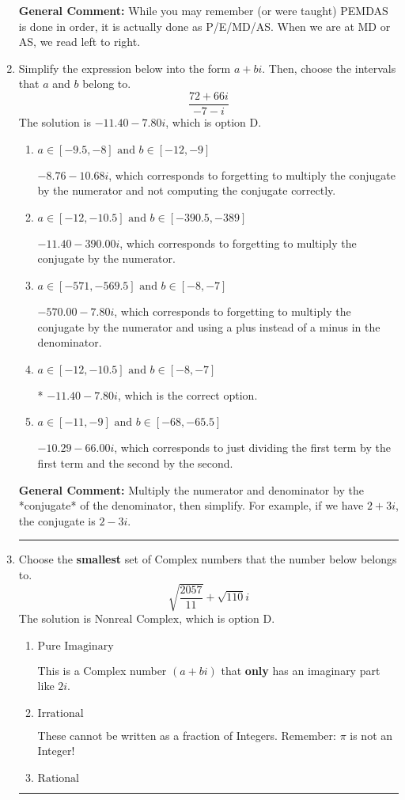 \documentclass{extbook}[14pt]
\newcommand{\litem}[1]{\item #1

\rule{\textwidth}{0.4pt}}
\begin{document}
\begin{enumerate}
{\textbf{General Comment:} While you may remember (or were taught) PEMDAS is done in order, it is actually done as P/E/MD/AS. When we are at MD or AS, we read left to right.
}
\litem{
Simplify the expression below into the form $a+bi$. Then, choose the intervals that $a$ and $b$ belong to.
\[ \frac{72 + 66 i}{-7 - i} \]The solution is \( -11.40  - 7.80 i \), which is option D.\begin{enumerate}[label=\Alph*.]
\item \( a \in [-9.5, -8] \text{ and } b \in [-12, -9] \)

 $-8.76  - 10.68 i$, which corresponds to forgetting to multiply the conjugate by the numerator and not computing the conjugate correctly.
\item \( a \in [-12, -10.5] \text{ and } b \in [-390.5, -389] \)

 $-11.40  - 390.00 i$, which corresponds to forgetting to multiply the conjugate by the numerator.
\item \( a \in [-571, -569.5] \text{ and } b \in [-8, -7] \)

 $-570.00  - 7.80 i$, which corresponds to forgetting to multiply the conjugate by the numerator and using a plus instead of a minus in the denominator.
\item \( a \in [-12, -10.5] \text{ and } b \in [-8, -7] \)

* $-11.40  - 7.80 i$, which is the correct option.
\item \( a \in [-11, -9] \text{ and } b \in [-68, -65.5] \)

 $-10.29  - 66.00 i$, which corresponds to just dividing the first term by the first term and the second by the second.
\end{enumerate}

\textbf{General Comment:} Multiply the numerator and denominator by the *conjugate* of the denominator, then simplify. For example, if we have $2+3i$, the conjugate is $2-3i$.
}
\litem{
Choose the \textbf{smallest} set of Complex numbers that the number below belongs to.
\[ \sqrt{\frac{2057}{11}}+\sqrt{110} i \]The solution is \( \text{Nonreal Complex} \), which is option D.\begin{enumerate}[label=\Alph*.]
\item \( \text{Pure Imaginary} \)

This is a Complex number $(a+bi)$ that \textbf{only} has an imaginary part like $2i$.
\item \( \text{Irrational} \)

These cannot be written as a fraction of Integers. Remember: $\pi$ is not an Integer!
\item \( \text{Rational} \)


\end{enumerate}}
\end{enumerate}
\end{document}
